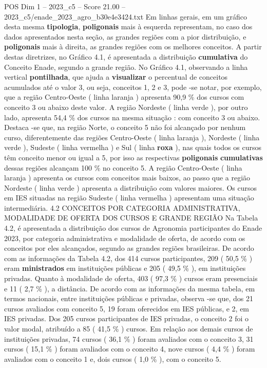 \begin{textsample}{POS Dim 1 – 2023\_c5 – Score 21.00 – 2023\_c5/enade\_2023\_agro\_b30e4e3424.txt}
Em linhas gerais, em um gráfico desta mesma \textbf{tipologia}, \textbf{poligonais} mais à esquerda representam, no caso dos dados apresentados nesta seção, as grandes regiões com a pior distribuição, e \textbf{poligonais} mais à direita, as grandes regiões com os melhores conceitos.
A partir destas diretrizes, no Gráfico 4.1, é apresentada a distribuição \textbf{cumulativa} do Conceito Enade, segundo a grande região.
No Gráfico 4.1, observando a linha vertical \textbf{pontilhada}, que ajuda a \textbf{visualizar} o percentual de conceitos acumulados até o valor 3, ou seja, conceitos 1, 2 e 3, pode -se notar, por exemplo, que a região Centro-Oeste ( linha laranja ) apresenta 90,9 \% dos cursos com conceito 3 ou abaixo deste valor.
A região Nordeste ( linha verde ), por outro lado, apresenta 54,4 \% dos cursos na mesma situação : com conceito 3 ou abaixo.
Destaca -se que, na região Norte, o conceito 5 não foi alcançado por nenhum curso, diferentemente das regiões Centro-Oeste ( linha laranja ), Nordeste ( linha verde ), Sudeste ( linha vermelha ) e Sul ( linha \textbf{roxa} ), nas quais todos os cursos têm conceito menor ou igual a 5, por isso as respectivas \textbf{poligonais} \textbf{cumulativas} dessas regiões alcançam 100 \% no conceito 5.
A região Centro-Oeste ( linha laranja ) apresenta os cursos com conceitos mais baixos, ao passo que a região Nordeste ( linha verde ) apresenta a distribuição com valores maiores.
Os cursos em IES situadas na região Sudeste ( linha vermelha ) apresentam uma situação intermediária. 4.2 CONCEITOS POR CATEGORIA ADMINISTRATIVA, MODALIDADE DE OFERTA DOS CURSOS E GRANDE REGIÃO Na Tabela 4.2, é apresentada a distribuição dos cursos de Agronomia participantes do Enade 2023, por categoria administrativa e modalidade de oferta, de acordo com os conceitos por eles alcançados, segundo as grandes regiões brasileiras.
De acordo com as informações da Tabela 4.2, dos 414 cursos participantes, 209 ( 50,5 \% ) eram \textbf{ministrados} em instituições públicas e 205 ( 49,5 \% ), em instituições privadas.
Quanto à modalidade de oferta, 403 ( 97,3 \% ) cursos eram presenciais e 11 ( 2,7 \% ), a distância.
De acordo com as informações da mesma tabela, em termos nacionais, entre instituições públicas e privadas, observa -se que, dos 21 cursos avaliados com conceito 5, 19 foram oferecidos em IES públicas, e 2, em IES privadas.
Dos 205 cursos participantes de IES privadas, o conceito 2 foi o valor modal, atribuído a 85 ( 41,5 \% ) cursos.
Em relação aos demais cursos de instituições privadas, 74 cursos ( 36,1 \% ) foram avaliados com o conceito 3, 31 cursos ( 15,1 \% ) foram avaliados com o conceito 4, nove cursos ( 4,4 \% ) foram avaliados com o conceito 1 e, dois cursos ( 1,0 \% ), com o conceito 5.

\end{textsample}
